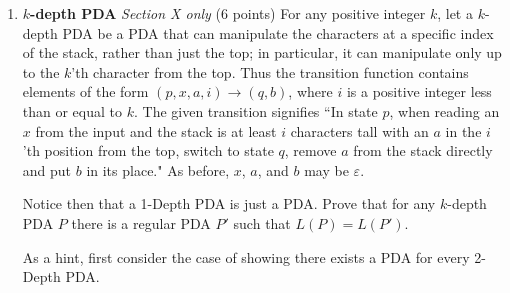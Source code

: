 \documentclass[11pt]{article}
\begin{document}
\begin{enumerate}
\begin{answer}
\begin{enumerate}
      Hence if $vxy$ does not lie entirely in one character, we can pump the string outside the language for any choice of $vxy$.
  \end{enumerate}

  As for any case of decomposition of $w$ we showed that we can pump the string outside of the language, this means that our assumption is wrong and that the language is not context-free.

\end{answer}

\item \textbf{$k$-depth PDA} \textit{Section X only} (6 points) For any positive integer $k$, let a $k$-depth PDA be a PDA that can manipulate the characters at a specific index of the stack, rather than just the top; in particular, it can manipulate only up to the $k$'th character from the top. Thus the transition function contains elements of the form $(p, x, a, i) \rightarrow (q, b)$, where $i$ is a positive integer less than or equal to $k$. The given transition signifies ``In state $p$, when reading an $x$ from the input and the stack is at least $i$ characters tall with an $a$ in the $i$'th position from the top, switch to state $q$, remove $a$ from the stack directly and put $b$ in its place."  As before, $x$, $a$, and $b$ may be $\varepsilon$.  

Notice then that a 1-Depth PDA is just a  PDA. Prove that for any $k$-depth PDA $P$ there is a regular PDA $P'$ such that $L(P) = L(P')$.

As a hint, first consider the case of showing there exists a PDA for every 2-Depth PDA. 


\end{enumerate}
\end{document}
